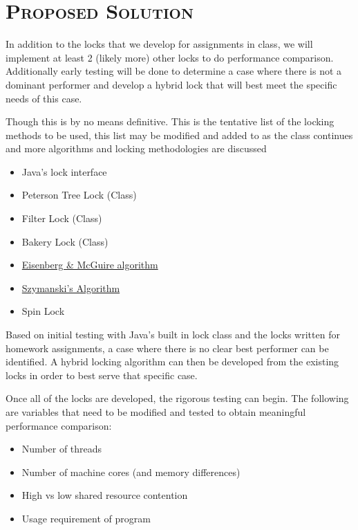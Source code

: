 \documentclass[finalProject.tex]{subfiles}
\begin{document}
\bigskip

\section*{\textsc{\Large Proposed Solution}}

In addition to the locks that we develop for assignments in class, we will implement at least 2 (likely more) other locks to do performance comparison. Additionally early testing will be done to determine a case where there is not a dominant performer and develop a hybrid lock that will best meet the specific needs of this case.

Though this is by no means definitive. This is the tentative list of the locking methods to be used, this list may be modified and added to as the class continues and more algorithms and locking methodologies are discussed 

\smallskip

\begin{itemize}
\item Java's lock interface
\item Peterson Tree Lock (Class)
\item Filter Lock (Class)
\item Bakery Lock (Class)
\item \href{http://en.wikipedia.org/wiki/Eisenberg_%26_McGuire_algorithm}{Eisenberg \& McGuire algorithm}
\item \href{http://en.wikipedia.org/wiki/Szymanski%27s_Algorithm}{Szymanski's Algorithm}
\item Spin Lock
\end{itemize}

Based on initial testing with Java's built in lock class and the locks written for homework assignments, a case where there is no clear best performer can be identified. A hybrid locking algorithm can then be developed from the existing locks in order to best serve that specific case. 

Once all of the locks are developed, the rigorous testing can begin. The following are variables that need to be modified and tested to obtain meaningful performance comparison:

\begin{itemize}
\item Number of threads
\item Number of machine cores (and memory differences)
\item High vs low shared resource contention
\item Usage requirement of program
\end{itemize}
\end{document}
